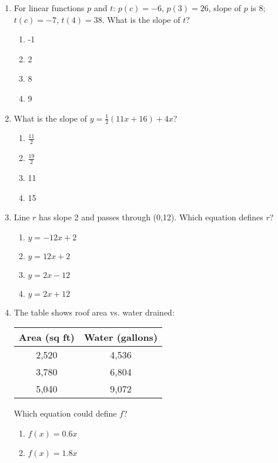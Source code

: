 \documentclass[12pt]{exam}
\begin{document}
\begin{enumerate}
\begin{enumerate}[label=\Alph*)]
    \end{enumerate}
    \item For linear functions $p$ and $t$: $p(c) = -6$, $p(3) = 26$, slope of $p$ is 8; $t(c) = -7$, $t(4) = 38$. What is the slope of $t$?
    \begin{enumerate}[label=\Alph*)]
        \item -1
        \item 2
        \item 8
        \item 9
    \end{enumerate}
    \item What is the slope of $y = \frac{1}{2}(11x + 16) + 4x$?
    \begin{enumerate}[label=\Alph*)]
        \item $\frac{11}{2}$
        \item $\frac{19}{2}$
        \item 11
        \item 15
    \end{enumerate}
    \item Line $r$ has slope 2 and passes through (0,12). Which equation defines $r$?
    \begin{enumerate}[label=\Alph*)]
        \item $y = -12x + 2$
        \item $y = 12x + 2$
        \item $y = 2x - 12$
        \item $y = 2x + 12$
    \end{enumerate}
    \item The table shows roof area vs. water drained:
    \begin{center}
        \begin{tabular}{|c|c|}
            \hline
            Area (sq ft) & Water (gallons) \\
            \hline
            2,520 & 4,536 \\
            3,780 & 6,804 \\
            5,040 & 9,072 \\
            \hline
        \end{tabular}
    \end{center}
    Which equation could define $f$?
    \begin{enumerate}[label=\Alph*)]
        \item $f(x) = 0.6x$
        \item $f(x) = 1.8x$

\end{enumerate}
\end{enumerate}
\end{document}
